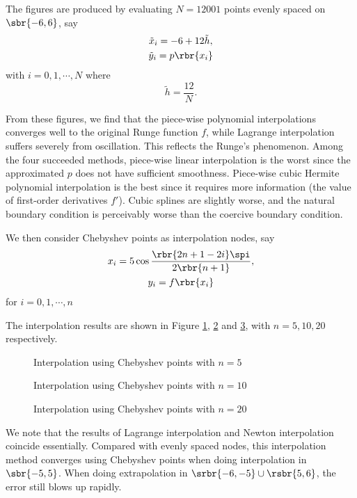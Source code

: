 \documentclass[english, nochinese]{pnote}
\begin{document}
The figures are produced by evaluating $ N = 12001 $ points evenly spaced on $ \sbr{ -6, 6 } $, say
\begin{gather}
\tilde{x}_i = -6 + 12 \tilde{h}, \\
\tilde{y}_i = p \rbr{x_i}
\end{gather}
with $ i = 0, 1, \cdots, N $ where
\begin{equation}
\tilde{h} = \frac{12}{N}.
\end{equation}

From these figures, we find that the piece-wise polynomial interpolations converges well to the original Runge function $f$, while Lagrange interpolation suffers severely from oscillation. This reflects the Runge's phenomenon. Among the four succeeded methods, piece-wise linear interpolation is the worst since the approximated $p$ does not have sufficient smoothness. Piece-wise cubic Hermite polynomial interpolation is the best since it requires more information (the value of first-order derivatives $f'$). Cubic splines are slightly worse, and the natural boundary condition is perceivably worse than the coercive boundary condition.

We then consider Chebyshev points as interpolation nodes, say
\begin{gather}
x_i = 5 \cos \frac{ \rbr{ 2 n + 1 - 2 i } \spi }{ 2 \rbr{ n + 1 } }, \\
y_i = f \rbr{x_i}
\end{gather}
for $ i = 0, 1, \cdots, n $

The interpolation results are shown in Figure \ref{Fig:Cheb5}, \ref{Fig:Cheb10} and \ref{Fig:Cheb20}, with $ n = 5, 10, 20 $ respectively.

\begin{figure}
\centering
\scalebox{0.7}{}
\caption{Interpolation using Chebyshev points with $ n = 5 $}
\label{Fig:Cheb5}
\end{figure}

\begin{figure}
\centering
\scalebox{0.7}{}
\caption{Interpolation using Chebyshev points with $ n = 10 $}
\label{Fig:Cheb10}
\end{figure}

\begin{figure}
\centering
\scalebox{0.7}{}
\caption{Interpolation using Chebyshev points with $ n = 20 $}
\label{Fig:Cheb20}
\end{figure}

We note that the results of Lagrange interpolation and Newton interpolation coincide essentially. Compared with evenly spaced nodes, this interpolation method converges using Chebyshev points when doing interpolation in $ \sbr{ -5, 5 } $. When doing extrapolation in $ \srbr{ -6, -5 } \cup \rsbr{ 5, 6 } $, the error still blows up rapidly.
\end{document}
